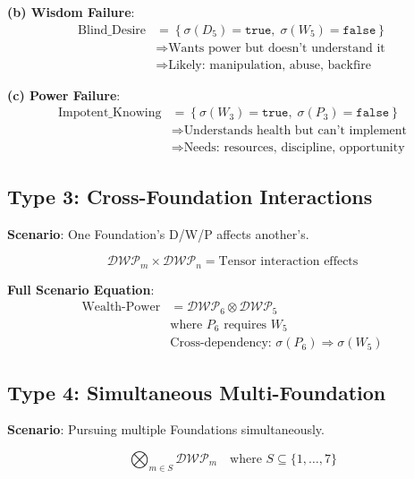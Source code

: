 \documentclass[11pt,twoside]{book}
\newcommand{\DWP}{\mathcal{DWP}}
\begin{document}
\textbf{(b) Wisdom Failure}:
\begin{align}
    \text{Blind\_Desire} &= \left\{
    \sigma(D_5) = \mathtt{true}, \;
    \sigma(W_5) = \mathtt{false}
    \right\} \\
    &\Rightarrow \text{Wants power but doesn't understand it} \\
    &\Rightarrow \text{Likely: manipulation, abuse, backfire}
\end{align}

\textbf{(c) Power Failure}:
\begin{align}
    \text{Impotent\_Knowing} &= \left\{
    \sigma(W_3) = \mathtt{true}, \;
    \sigma(P_3) = \mathtt{false}
    \right\} \\
    &\Rightarrow \text{Understands health but can't implement} \\
    &\Rightarrow \text{Needs: resources, discipline, opportunity}
\end{align}

\subsection{Type 3: Cross-Foundation Interactions}

\textbf{Scenario}: One Foundation's D/W/P affects another's.

\begin{equation}
\boxed{
    \DWP_m \times \DWP_n = \text{Tensor interaction effects}
}
\end{equation}

\textbf{Full Scenario Equation}:
\begin{align}
    \text{Wealth-Power} &= \DWP_6 \otimes \DWP_5 \\
    &\text{where } P_6 \text{ requires } W_5 \nonumber \\
    &\text{Cross-dependency: } \sigma(P_6) \Rightarrow \sigma(W_5) \nonumber
\end{align}

\subsection{Type 4: Simultaneous Multi-Foundation}

\textbf{Scenario}: Pursuing multiple Foundations simultaneously.

\begin{equation}
\boxed{
    \bigotimes_{m \in S} \DWP_m \quad \text{where } S \subseteq \{1, \ldots, 7\}
}
\end{equation}
\end{document}

